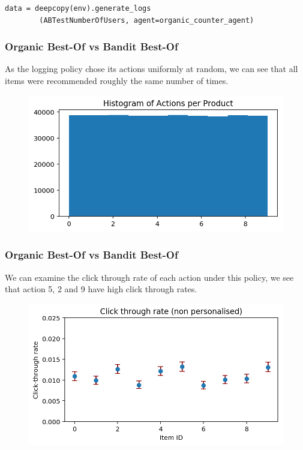 \begin{frame}[fragile]
  \frametitle{}
  \begin{small}
\begin{verbatim}
data = deepcopy(env).generate_logs
        (ABTestNumberOfUsers, agent=organic_counter_agent)
\end{verbatim}
\end{small}
\end{frame}




\begin{frame}
\frametitle{Organic Best-Of vs Bandit Best-Of}

As the logging policy chose its actions uniformly at random, we can see that all items were recommended roughly the same number of times.

\begin{figure}[h!]
\includegraphics[scale=0.4]{images/organic_bestof0.png}
\centering
\label{motex1}
\end{figure}
\end{frame}

\begin{frame}
\frametitle{Organic Best-Of vs Bandit Best-Of}

We can examine the click through rate of each action under this policy, we see that action 5, 2 and 9 have high click through rates.

\begin{figure}[h!]
\includegraphics[scale=0.4]{images/organic_bestof1.png}
\centering
\label{motex1}
\end{figure}
\end{frame}

